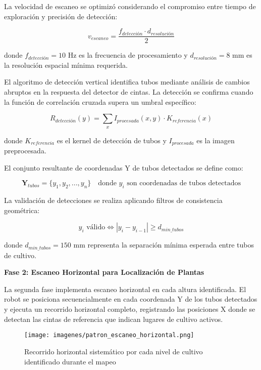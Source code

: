 La velocidad de escaneo se optimizó considerando el compromiso entre tiempo de exploración y precisión de detección:

\begin{equation}
v_{escaneo} = \frac{f_{detección} \cdot d_{resolución}}{2}
\end{equation}

donde $f_{detección} = 10$ Hz es la frecuencia de procesamiento y $d_{resolución} = 8$ mm es la resolución espacial mínima requerida.

El algoritmo de detección vertical identifica tubos mediante análisis de cambios abruptos en la respuesta del detector de cintas. La detección se confirma cuando la función de correlación cruzada supera un umbral específico:

\begin{equation}
R_{detección}(y) = \sum_{x} I_{procesada}(x,y) \cdot K_{referencia}(x)
\end{equation}

donde $K_{referencia}$ es el kernel de detección de tubos y $I_{procesada}$ es la imagen preprocesada.

El conjunto resultante de coordenadas Y de tubos detectados se define como:

\begin{equation}
\mathbf{Y}_{tubos} = \{y_1, y_2, ..., y_n\} \quad \text{donde } y_i \text{ son coordenadas de tubos detectados}
\end{equation}

La validación de detecciones se realiza aplicando filtros de consistencia geométrica:

\begin{equation}
y_i \text{ válido} \Leftrightarrow |y_i - y_{i-1}| \geq d_{min\_tubos}
\end{equation}

donde $d_{min\_tubos} = 150$ mm representa la separación mínima esperada entre tubos de cultivo.

\textbf{Fase 2: Escaneo Horizontal para Localización de Plantas}

La segunda fase implementa escaneo horizontal en cada altura identificada. El robot se posiciona secuencialmente en cada coordenada Y de los tubos detectados y ejecuta un recorrido horizontal completo, registrando las posiciones X donde se detectan las cintas de referencia que indican lugares de cultivo activos.

\begin{figure}[h]
\centering
\texttt{[image: imagenes/patron\_escaneo\_horizontal.png]}
\caption{Recorrido horizontal sistemático por cada nivel de cultivo identificado durante el mapeo}
\label{fig:patron_escaneo_horizontal}
\end{figure}

